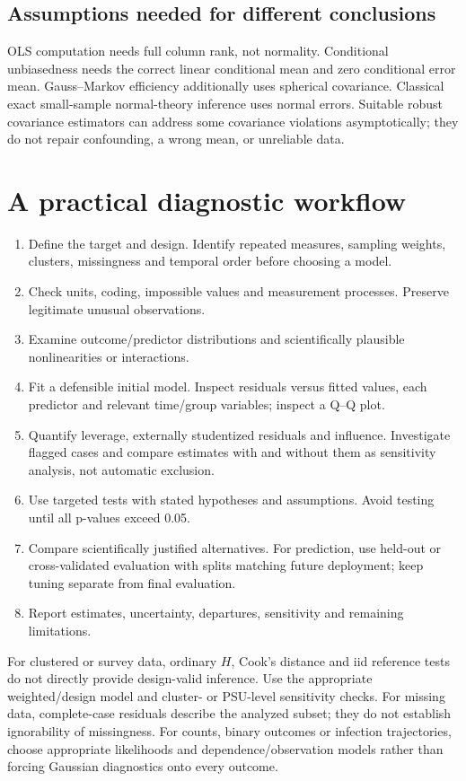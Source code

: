 \documentclass[11pt]{article}
\begin{document}
\subsection{Assumptions needed for different conclusions}
OLS computation needs full column rank, not normality. Conditional unbiasedness needs the correct linear conditional mean and zero conditional error mean. Gauss--Markov efficiency additionally uses spherical covariance. Classical exact small-sample normal-theory inference uses normal errors. Suitable robust covariance estimators can address some covariance violations asymptotically; they do not repair confounding, a wrong mean, or unreliable data.
\section{A practical diagnostic workflow}
\begin{enumerate}
\item Define the target and design. Identify repeated measures, sampling weights, clusters, missingness and temporal order before choosing a model.
\item Check units, coding, impossible values and measurement processes. Preserve legitimate unusual observations.
\item Examine outcome/predictor distributions and scientifically plausible nonlinearities or interactions.
\item Fit a defensible initial model. Inspect residuals versus fitted values, each predictor and relevant time/group variables; inspect a Q--Q plot.
\item Quantify leverage, externally studentized residuals and influence. Investigate flagged cases and compare estimates with and without them as sensitivity analysis, not automatic exclusion.
\item Use targeted tests with stated hypotheses and assumptions. Avoid testing until all p-values exceed 0.05.
\item Compare scientifically justified alternatives. For prediction, use held-out or cross-validated evaluation with splits matching future deployment; keep tuning separate from final evaluation.
\item Report estimates, uncertainty, departures, sensitivity and remaining limitations.
\end{enumerate}
For clustered or survey data, ordinary $H$, Cook's distance and iid reference tests do not directly provide design-valid inference. Use the appropriate weighted/design model and cluster- or PSU-level sensitivity checks. For missing data, complete-case residuals describe the analyzed subset; they do not establish ignorability of missingness. For counts, binary outcomes or infection trajectories, choose appropriate likelihoods and dependence/observation models rather than forcing Gaussian diagnostics onto every outcome.
\end{document}
